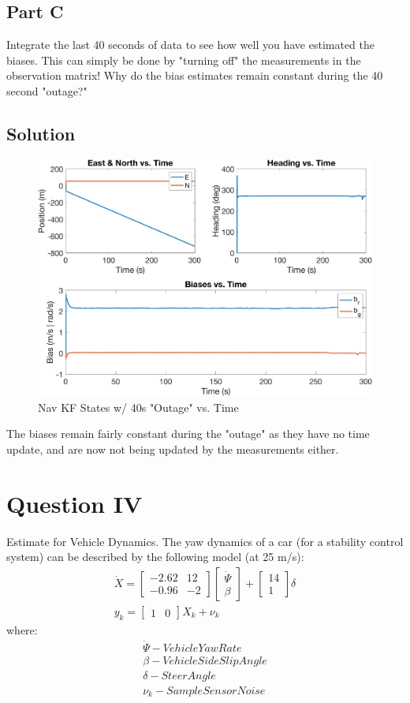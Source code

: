 \documentclass{article}
\begin{document}
\subsection*{Part C}
Integrate the last 40 seconds of data to see how well you have estimated the biases.  This can simply be done by "turning off" the measurements 
in the observation matrix! Why do the bias estimates remain constant during the 40 second "outage?"
\subsection*{Solution}
\begin{figure}[H]
    \centering
    \includegraphics[width=0.75\linewidth]{../figures/p3c.png}
    \caption{Nav KF States w/ 40s "Outage" vs. Time}\label{fig:p3c}
\end{figure}
The biases remain fairly constant during the "outage" as they have no time update, and are now not being updated by the measurements either.

\section*{Question IV}
Estimate for Vehicle Dynamics. The yaw dynamics of a car (for a stability control system) can be described by the following model (at 25 m/s):
\begin{gather}
    \dot{X} = \begin{bmatrix}
        -2.62 & 12 \\
        -0.96 & -2
    \end{bmatrix}\begin{bmatrix}
        \dot{\Psi} \\
        \beta
    \end{bmatrix} + \begin{bmatrix}
        14 \\
        1
    \end{bmatrix}\delta \\
    y_k = \begin{bmatrix}
        1 & 0
    \end{bmatrix}X_k + \nu_k
\end{gather}
where:
\begin{gather}
    \dot{\Psi} - Vehicle Yaw Rate\\
    \beta - Vehicle Side Slip Angle\\
    \delta - Steer Angle\\
    \nu_k - Sample Sensor Noise
\end{gather}
\end{document}
